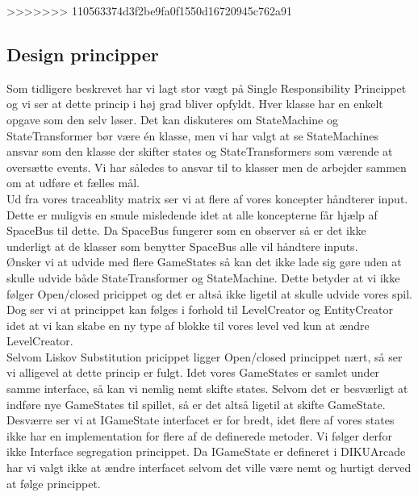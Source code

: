 >>>>>>> 110563374d3f2be9fa0f1550d16720945c762a91
\subsection{Design principper}
Som tidligere beskrevet har vi lagt stor vægt på Single Responsibility Princippet og vi ser at dette princip i høj grad bliver opfyldt. Hver klasse har en enkelt opgave som den selv løser. Det kan diskuteres om StateMachine og StateTransformer bør være én klasse, men vi har valgt at se StateMachines ansvar som den klasse der skifter states og StateTransformers som værende at oversætte events. Vi har således to ansvar til to klasser men de arbejder sammen om at udføre et fælles mål.\\
Ud fra vores traceablity matrix ser vi at flere af vores koncepter håndterer input. Dette er muligvis en smule misledende idet at alle koncepterne får hjælp af SpaceBus til dette. Da SpaceBus fungerer som en observer så er det ikke underligt at de klasser som benytter SpaceBus alle vil håndtere inputs.\\

Ønsker vi at udvide med flere GameStates så kan det ikke lade sig gøre uden at skulle udvide både StateTransformer og StateMachine. Dette betyder at vi ikke følger Open/closed pricippet og det er altså ikke ligetil at skulle udvide vores spil. Dog ser vi at princippet kan følges i forhold til LevelCreator og EntityCreator idet at vi kan skabe en ny type af blokke til vores level ved kun at ændre LevelCreator.\\

Selvom Liskov Substitution pricippet ligger Open/closed princippet nært, så ser vi alligevel at dette princip er fulgt. Idet vores GameStates er samlet under samme interface, så kan vi nemlig nemt skifte states. Selvom det er besværligt at indføre nye GameStates til spillet, så er det altså ligetil at skifte GameState.\\

Desværre ser vi at IGameState interfacet er for bredt, idet flere af vores states ikke har en implementation for flere af de definerede metoder. Vi følger derfor ikke Interface segregation princippet. Da IGameState er defineret i DIKUArcade har vi valgt ikke at ændre interfacet selvom det ville være nemt og hurtigt derved at følge princippet.\\

